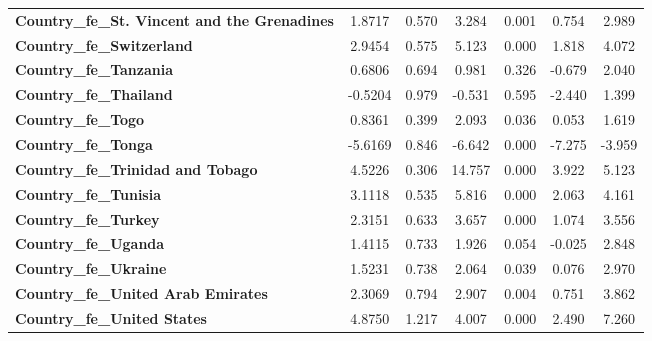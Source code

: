 \begin{center}
\begin{tabular}{lcccccc}
\textbf{Country\_fe\_St. Vincent and the Grenadines} &       1.8717  &        0.570     &     3.284  &         0.001        &        0.754    &        2.989     \\
\textbf{Country\_fe\_Switzerland}                    &       2.9454  &        0.575     &     5.123  &         0.000        &        1.818    &        4.072     \\
\textbf{Country\_fe\_Tanzania}                       &       0.6806  &        0.694     &     0.981  &         0.326        &       -0.679    &        2.040     \\
\textbf{Country\_fe\_Thailand}                       &      -0.5204  &        0.979     &    -0.531  &         0.595        &       -2.440    &        1.399     \\
\textbf{Country\_fe\_Togo}                           &       0.8361  &        0.399     &     2.093  &         0.036        &        0.053    &        1.619     \\
\textbf{Country\_fe\_Tonga}                          &      -5.6169  &        0.846     &    -6.642  &         0.000        &       -7.275    &       -3.959     \\
\textbf{Country\_fe\_Trinidad and Tobago}            &       4.5226  &        0.306     &    14.757  &         0.000        &        3.922    &        5.123     \\
\textbf{Country\_fe\_Tunisia}                        &       3.1118  &        0.535     &     5.816  &         0.000        &        2.063    &        4.161     \\
\textbf{Country\_fe\_Turkey}                         &       2.3151  &        0.633     &     3.657  &         0.000        &        1.074    &        3.556     \\
\textbf{Country\_fe\_Uganda}                         &       1.4115  &        0.733     &     1.926  &         0.054        &       -0.025    &        2.848     \\
\textbf{Country\_fe\_Ukraine}                        &       1.5231  &        0.738     &     2.064  &         0.039        &        0.076    &        2.970     \\
\textbf{Country\_fe\_United Arab Emirates}           &       2.3069  &        0.794     &     2.907  &         0.004        &        0.751    &        3.862     \\
\textbf{Country\_fe\_United States}                  &       4.8750  &        1.217     &     4.007  &         0.000        &        2.490    &        7.260     \\

\end{tabular}
\end{center}
